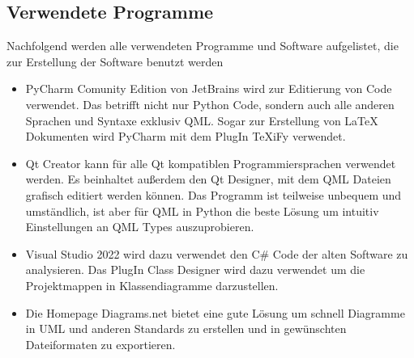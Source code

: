 \subsection{Verwendete Programme }

Nachfolgend werden alle verwendeten Programme und Software aufgelistet, die zur Erstellung der Software benutzt werden
\begin{itemize}
        \item PyCharm Comunity Edition von JetBrains wird zur Editierung von Code verwendet. Das betrifft nicht nur Python Code,
        sondern auch alle anderen Sprachen und Syntaxe exklusiv QML. Sogar zur Erstellung von LaTeX Dokumenten wird
        PyCharm mit dem PlugIn TeXiFy verwendet.
        \item Qt Creator kann für alle Qt kompatiblen Programmiersprachen verwendet werden. Es beinhaltet außerdem den
        Qt Designer, mit dem QML Dateien grafisch editiert werden können. Das Programm ist teilweise unbequem und umständlich,
        ist aber für QML in Python die beste Lösung um intuitiv Einstellungen an QML Types auszuprobieren.
        \item Visual Studio 2022 wird dazu verwendet den C\# Code der alten Software zu analysieren.
        Das PlugIn \glqq Class Designer \grqq wird dazu verwendet um die Projektmappen in Klassendiagramme darzustellen.
        \item Die Homepage Diagrams.net bietet eine gute Lösung um schnell Diagramme in UML und anderen Standards zu erstellen und
        in gewünschten Dateiformaten zu exportieren.
\end{itemize}